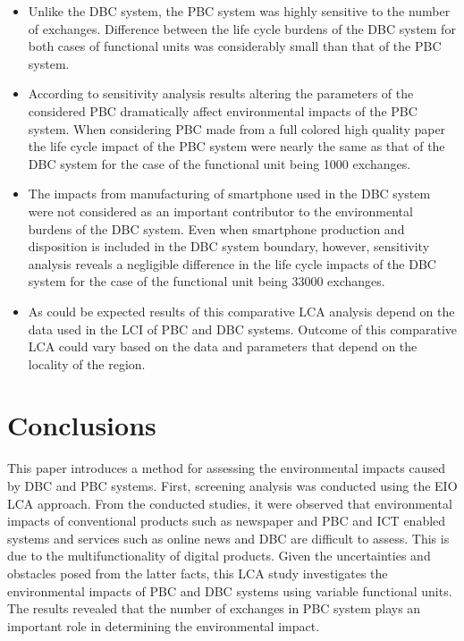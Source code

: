 \documentclass[conference]{IEEEtran}
\begin{document}
\begin{itemize}
\item Unlike the DBC system, the PBC system was highly sensitive to the number of exchanges. Difference between the life cycle burdens of the DBC system for both cases of functional units was considerably small than that of the PBC system.
\item According to sensitivity analysis results altering the parameters of the considered PBC dramatically affect environmental impacts of the PBC system. When considering PBC made from a full colored high quality paper the life cycle impact of the PBC system were nearly the same as that of the DBC system for the case of the functional unit being 1000 exchanges. 
\item The impacts from manufacturing of smartphone used in the DBC system were not considered as an important contributor to the environmental burdens of the DBC system. Even when smartphone production and disposition is included in the DBC system boundary, however, sensitivity analysis reveals a negligible difference in the life cycle impacts of the DBC system for the case of the functional unit being 33000 exchanges.
\item As could be expected results of this comparative LCA analysis depend on the data used in the LCI of PBC and DBC systems. Outcome of this comparative LCA could vary based on the data and parameters that depend on the locality of the region.

\end{itemize}

\section{Conclusions}

This paper introduces a method for assessing the environmental impacts caused by DBC and PBC systems. First, screening analysis was conducted using the EIO LCA approach. From the conducted studies, it were observed that environmental impacts of conventional products such as newspaper and PBC and ICT enabled systems and services such as online news and DBC are difficult to assess. This is due to the multifunctionality of digital products. Given the uncertainties and obstacles posed from the latter facts, this LCA study investigates the environmental impacts of PBC and DBC systems using variable functional units. The results revealed that the number of exchanges in PBC system plays an important role in determining the environmental impact.
\end{document}
